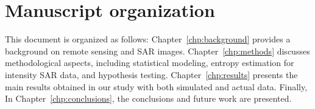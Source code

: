 \section{Manuscript organization}\label{sec:research_questions}

\hypersetup{linkcolor=blue}
This document is organized as follows: 
Chapter~\ref{chp:background} provides a background on remote sensing and SAR images. 
Chapter~\ref{chp:methods} discusses methodological aspects, including statistical modeling, entropy estimation for intensity SAR data, and hypothesis testing. 
Chapter~\ref{chp:results} presents the main results obtained in our study with both simulated and actual data. Finally,
In Chapter~\ref{chp:conclusions}, the conclusions and future work are presented.



